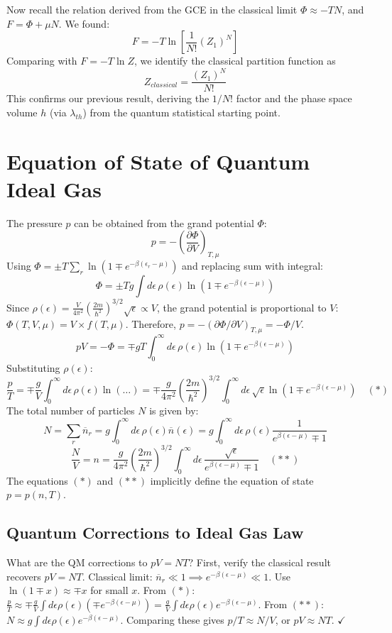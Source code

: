 \documentclass[11pt]{article}
\newcommand{\pderiv}[2]{\frac{\partial #1}{\partial #2}}
\newcommand{\lambdaT}{\lambda_{th}} %
\newcommand{\eps}{\epsilon}
\newcommand{\nbar}{\overline{n}} %
\begin{document}
Now recall the relation derived from the GCE in the classical limit $\Phi \approx -TN$, and $F = \Phi + \mu N$. We found:
\[ F = -T \ln \left[ \frac{1}{N!} (Z_1)^N \right] \]
Comparing with $F = -T \ln Z$, we identify the classical partition function as
\[ Z_{classical} = \frac{(Z_1)^N}{N!} \]
This confirms our previous result, deriving the $1/N!$ factor and the phase space volume $h$ (via $\lambdaT$) from the quantum statistical starting point.

\section*{Equation of State of Quantum Ideal Gas}

The pressure $p$ can be obtained from the grand potential $\Phi$:
\[ p = -\left( \pderiv{\Phi}{V} \right)_{T,\mu} \]
Using $\Phi = \pm T \sum_r \ln(1 \mp e^{-\beta(\eps_r-\mu)})$ and replacing sum with integral:
\[ \Phi = \pm T g \int d\eps \, \rho(\eps) \ln(1 \mp e^{-\beta(\eps-\mu)}) \]
Since $\rho(\eps) = \frac{V}{4\pi^2}(\frac{2m}{\hbar^2})^{3/2}\sqrt{\eps} \propto V$, the grand potential is proportional to $V$: $\Phi(T, V, \mu) = V \times f(T, \mu)$.
Therefore, $p = -(\partial \Phi / \partial V)_{T,\mu} = - \Phi / V$.
\[ pV = -\Phi = \mp g T \int_0^\infty d\eps \, \rho(\eps) \ln(1 \mp e^{-\beta(\eps-\mu)}) \]
Substituting $\rho(\eps)$:
\[ \frac{p}{T} = \mp \frac{g}{V} \int_0^\infty d\eps \, \rho(\eps) \ln(\dots) = \mp \frac{g}{4\pi^2} \left(\frac{2m}{\hbar^2}\right)^{3/2} \int_0^\infty d\eps \, \sqrt{\eps} \ln(1 \mp e^{-\beta(\eps-\mu)}) \quad (*) \]
The total number of particles $N$ is given by:
\[ N = \sum_r \nbar_r = g \int_0^\infty d\eps \, \rho(\eps) \nbar(\eps) = g \int_0^\infty d\eps \, \rho(\eps) \frac{1}{e^{\beta(\eps-\mu)} \mp 1} \]
\[ \frac{N}{V} = n = \frac{g}{4\pi^2} \left(\frac{2m}{\hbar^2}\right)^{3/2} \int_0^\infty d\eps \, \frac{\sqrt{\eps}}{e^{\beta(\eps-\mu)} \mp 1} \quad (**) \]
The equations $(*)$ and $(**)$ implicitly define the equation of state $p=p(n, T)$.

\subsection*{Quantum Corrections to Ideal Gas Law}

What are the QM corrections to $pV = NT$? First, verify the classical result recovers $pV=NT$.
Classical limit: $\nbar_r \ll 1 \implies e^{-\beta(\eps-\mu)} \ll 1$.
Use $\ln(1 \mp x) \approx \mp x$ for small $x$.
From $(*)$: $\frac{p}{T} \approx \mp \frac{g}{V} \int d\eps \rho(\eps) (\mp e^{-\beta(\eps-\mu)}) = \frac{g}{V} \int d\eps \rho(\eps) e^{-\beta(\eps-\mu)}$.
From $(**)$: $N \approx g \int d\eps \rho(\eps) e^{-\beta(\eps-\mu)}$.
Comparing these gives $p/T \approx N/V$, or $pV \approx NT$. $\checkmark$
\end{document}
